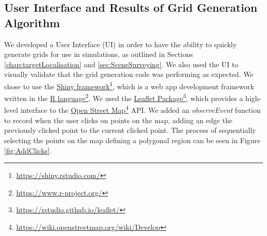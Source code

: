 \subsection{User Interface and Results of Grid Generation Algorithm}
We developed a User Interface (UI) in order to have the ability to quickly generate grids for use in simulations, as outlined in Sections \ref{chap:targetLocalisation} and \ref{sec:SceneSurveying}. We also used the UI to visually validate that the grid generation code was performing as expected. We chose to use the  \href{https://shiny.rstudio.com/}{Shiny framework}\footnote{\href {https://shiny.rstudio.com/}{https://shiny.rstudio.com/}}, which is a web app development framework written in the \href{https://www.r-project.org/}{R language}\footnote{\href {https://www.r-project.org/}{https://www.r-project.org/}}.
We used the \href{https://rstudio.github.io/leaflet/}{Leaflet Package}\footnote{\href {https://rstudio.github.io/leaflet/}{https://rstudio.github.io/leaflet/}}, which provides a high-level interface to the \href{https://wiki.openstreetmap.org/wiki/Develop}{Open Street Map}\footnote{\href {https://wiki.openstreetmap.org/wiki/Develop}{https://wiki.openstreetmap.org/wiki/Develop}} API. We added an \textit{observeEvent} function to record when the user clicks on points on the map, adding an edge the previously clicked point to the current clicked point. The process of sequentially selecting the points on the map defining a polygonal region can be seen in Figure \ref{fig:AddClicks}. 

